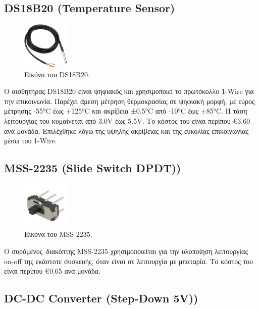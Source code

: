 \documentclass[conference]{IEEEtran}
\begin{document}
\subsection{DS18B20 (Temperature Sensor)}

\begin{figure}[H]
	\centerline{\includegraphics[width=0.2\textwidth]{assets/temp}}
	\caption{Εικόνα του DS18B20.}
	\label{Εικόνα του DS18B20.}
\end{figure}

Ο αισθητήρας DS18B20 είναι ψηφιακός και χρησιμοποιεί το πρωτόκολλο 1-Wire για την επικοινωνία. Παρέχει άμεση μέτρηση θερμοκρασίας σε ψηφιακή μορφή, με εύρος μέτρησης -55°C έως +125°C και ακρίβεια ±0.5°C από -10°C έως +85°C. Η τάση λειτουργίας του κυμαίνεται από 3.0V έως 5.5V. Το κόστος του είναι περίπου €3.60 ανά μονάδα. Επιλέχθηκε λόγω της υψηλής ακρίβειας και της ευκολίας επικοινωνίας μέσω του 1-Wire. \cite{ds18b20}

\subsection{MSS-2235 (Slide Switch DPDT))}

\begin{figure}[H]
	\centerline{\includegraphics[width=0.2\textwidth]{assets/switch}}
	\caption{Εικόνα του MSS-2235.}
	\label{Εικόνα του MSS-2235.}
\end{figure}

Ο συρόμενος διακόπτης MSS-2235 χρησιμοποιείται για την υλοποίηση λειτουργίας on-off της εκάστοτε συσκευής, όταν είναι σε λειτουργία με μπαταρία. Το κόστος του είναι περίπου €0.65 ανά μονάδα. \cite{mss2235}

\subsection{DC-DC Converter (Step-Down 5V))}
\end{document}
